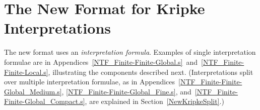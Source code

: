 \documentclass{easychair}
\begin{document}
\section{The New Format for Kripke Interpretations}
\label{NewKripke}
 
The new format uses an {\em interpretation formula}. 
Examples of single interpretation formulae are in 
Appendices~\ref{NTF_Finite-Finite-Global.s}~and~\ref{NTF_Finite-Finite-Local.s}, 
illustrating the components described next. 
(Interpretations split over multiple interpretation formulae, as in 
Appendices~\ref{NTF_Finite-Finite-Global_Medium.s}, \ref{NTF_Finite-Finite-Global_Fine.s}, 
and~\ref{NTF_Finite-Finite-Global_Compact.s}, are explained in Section~\ref{NewKripkeSplit}.)
\end{document}
